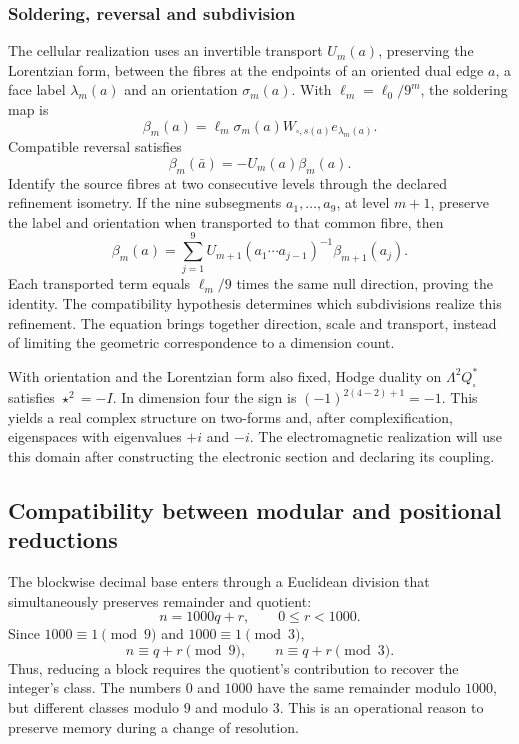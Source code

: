 \subsubsection{Soldering, reversal and subdivision}

The cellular realization uses an invertible transport \(U_m(a)\),
preserving the Lorentzian form, between the fibres at the endpoints of
an oriented dual edge \(a\), a face
label \(\lambda_m(a)\) and an orientation \(\sigma_m(a)\).
With \(\ell_m=\ell_0/9^m\), the soldering map is
\[
 \beta_m(a)=\ell_m\sigma_m(a)
 W_{\square,s(a)}e_{\lambda_m(a)}.
\]
Compatible reversal satisfies
\[
 \beta_m(\bar a)=-U_m(a)\beta_m(a).
\]
Identify the source fibres at two consecutive levels through
the declared refinement isometry. If the nine subsegments
\(a_1,\ldots,a_9\), at level \(m+1\), preserve the label
and orientation when transported to that common fibre, then
\begin{equation}
 \beta_m(a)=\sum_{j=1}^9
 U_{m+1}(a_1\cdots a_{j-1})^{-1}\beta_{m+1}(a_j).
 \label{eq:soldadura-refinamiento}
\end{equation}
Each transported term equals \(\ell_m/9\) times the same
null direction, proving the identity. The compatibility
hypothesis determines which subdivisions realize this refinement.
The equation brings together direction, scale and transport, instead of limiting
the geometric correspondence to a dimension count.

With orientation and the Lorentzian form also fixed, Hodge
duality on \(\Lambda^2Q_\square^*\) satisfies \(\star^2=-I\).
In dimension four the sign is \((-1)^{2(4-2)+1}=-1\).
This yields a real complex structure on two-forms and,
after complexification, eigenspaces with eigenvalues \(+i\) and
\(-i\). The electromagnetic realization will use this domain
after constructing the electronic section and declaring its coupling.

\subsection{Compatibility between modular and positional reductions}

The blockwise decimal base enters through a Euclidean division
that simultaneously preserves remainder and quotient:
\[
 n=1000q+r,\qquad 0\le r<1000.
\]
Since \(1000\equiv1\pmod9\) and \(1000\equiv1\pmod3\),
\[
 n\equiv q+r\pmod9,\qquad n\equiv q+r\pmod3.
\]
Thus, reducing a block requires the quotient's
contribution to recover the integer's class. The numbers \(0\) and
\(1000\) have the same remainder modulo \(1000\), but different classes
modulo \(9\) and modulo \(3\). This is an operational reason to preserve
memory during a change of resolution.

